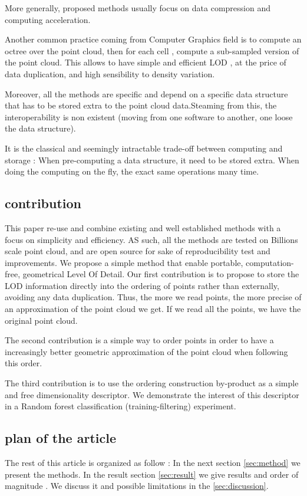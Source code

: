 		More generally, proposed methods usually focus on data compression and computing acceleration.
		
		Another common practice coming from Computer Graphics field is to compute an octree over the point cloud, then for each cell , compute a sub-sampled version of the point cloud.
		This allows to have simple and efficient LOD , at the price of data duplication, and high sensibility to density variation.
		
		Moreover, all the methods are specific and depend on a specific data structure that has to be stored extra to the point cloud data.Steaming from this, the interoperability is non existent (moving from one software to another, one loose the data structure).
		
		It is the classical and seemingly intractable trade-off between computing and storage : When pre-computing a data structure, it need to be stored extra. When doing the computing on the fly, the exact same operations many time.
	
	\subsection{contribution}
		
		This paper re-use and combine existing and well established methods with a focus on  simplicity and efficiency. AS such, all the methods are tested on Billions scale point cloud, and are open source for sake of reproducibility test and improvements.
		We propose a simple method that enable portable, computation-free, geometrical Level Of Detail.
		Our first contribution is to propose to store the LOD information directly into the ordering of points rather than externally, avoiding any data duplication.
		Thus, the more we read points, the more precise of an approximation of the point cloud we get. If we read all the points, we have the original point cloud.
		
		The second contribution is a simple way to order points in order to have a increasingly better geometric approximation of the point cloud when following this order.
		
		The third contribution is to use the ordering construction by-product as a simple and free dimensionality descriptor. We demonstrate the interest of this descriptor in a Random forest classification (training-filtering) experiment.
			
		
	\subsection{plan of the article}
		The rest of this article is organized as follow :
		In the next section \ref{sec:method} we present the methods.  
		In the result section \ref{sec:result} we give results and order of magnitude
		. We discuss it and possible limitations in the \ref{sec:discussion}.  
